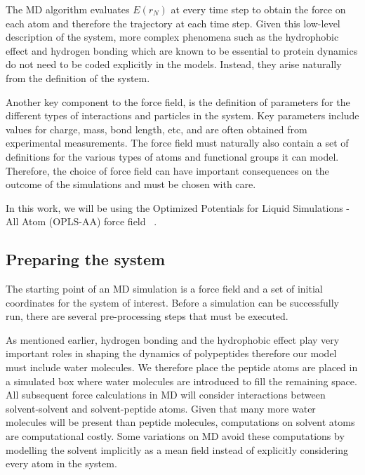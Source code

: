 The MD algorithm evaluates $E(r_{N})$ at every time step to obtain the force on each atom and therefore the trajectory at each time step. Given this low-level description of the system, more complex phenomena such as the hydrophobic effect and hydrogen bonding which are known to be essential to protein dynamics do not need to be coded explicitly in the models. Instead, they arise naturally from the definition of the system.

Another key component to the force field, is the definition of parameters for the different types of interactions and particles in the system. Key parameters include values for charge, mass, bond length, etc, and are often obtained from experimental measurements. The force field must naturally also contain a set of definitions for the various types of atoms and functional groups it can model. Therefore, the choice of force field can have important consequences on the outcome of the simulations and must be chosen with care.

In this work, we will be using the Optimized Potentials for Liquid Simulations - All Atom (OPLS-AA) force field ~\cite{jorgensen1988opls}.


\subsection{Preparing the system}

The starting point of an MD simulation is a force field and a set of initial coordinates for the system of interest. Before a simulation can be successfully run, there are several pre-processing steps that must be executed. 

As mentioned earlier, hydrogen bonding and the hydrophobic effect play very important roles in shaping the dynamics of polypeptides therefore our model must include water molecules. We therefore place the peptide atoms are placed in a simulated box where water molecules are introduced to fill the remaining space. All subsequent force calculations in MD will consider interactions between solvent-solvent and solvent-peptide atoms. Given that many more water molecules will be present than peptide molecules, computations on solvent atoms are computational costly. Some variations on MD avoid these computations by modelling the solvent implicitly as a mean field instead of explicitly considering every atom in the system. 

